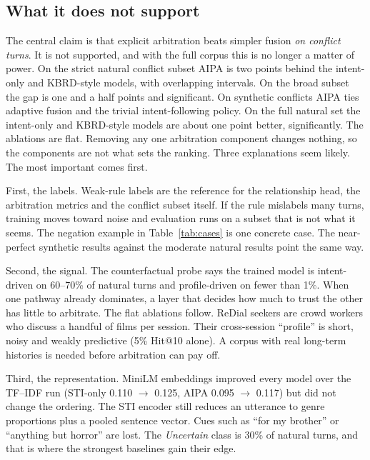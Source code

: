 \subsection{What it does not support}
The central claim is that explicit arbitration beats simpler fusion \emph{on conflict turns}. It is not supported, and with the full corpus this is no longer a matter of power. On the strict natural conflict subset AIPA is two points behind the intent-only and KBRD-style models, with overlapping intervals. On the broad subset the gap is one and a half points and significant. On synthetic conflicts AIPA ties adaptive fusion and the trivial intent-following policy. On the full natural set the intent-only and KBRD-style models are about one point better, significantly. The ablations are flat. Removing any one arbitration component changes nothing, so the components are not what sets the ranking. Three explanations seem likely. The most important comes first.

First, the labels. Weak-rule labels are the reference for the relationship head, the arbitration metrics and the conflict subset itself. If the rule mislabels many turns, training moves toward noise and evaluation runs on a subset that is not what it seems. The negation example in Table~\ref{tab:cases} is one concrete case. The near-perfect synthetic results against the moderate natural results point the same way.

Second, the signal. The counterfactual probe says the trained model is intent-driven on 60--70\% of natural turns and profile-driven on fewer than 1\%. When one pathway already dominates, a layer that decides how much to trust the other has little to arbitrate. The flat ablations follow. ReDial seekers are crowd workers who discuss a handful of films per session. Their cross-session ``profile'' is short, noisy and weakly predictive (5\% Hit@10 alone). A corpus with real long-term histories is needed before arbitration can pay off.

Third, the representation. MiniLM embeddings improved every model over the TF--IDF run (STI-only 0.110 $\to$ 0.125, AIPA 0.095 $\to$ 0.117) but did not change the ordering. The STI encoder still reduces an utterance to genre proportions plus a pooled sentence vector. Cues such as ``for my brother'' or ``anything but horror'' are lost. The \emph{Uncertain} class is 30\% of natural turns, and that is where the strongest baselines gain their edge.

